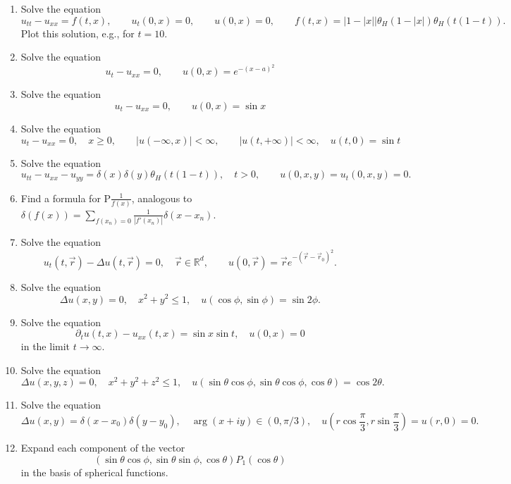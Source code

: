 \documentclass[a4paper,11pt]{article}
\begin{document}
\begin{enumerate}
\item\label{item:10} Solve the equation
\[u_{tt}-u_{xx} = f(t,x), \qquad u_t(0,x)=0, \qquad u(0,x)=0, \qquad f(t,x) = |1-|x||\theta_H(1-|x|)\theta_H(t(1-t)).\]
Plot this solution, e.g., for \(t=10\).

\item\label{item:11} Solve the equation
\[u_t-u_{xx}=0, \qquad u(0,x)=e^{-(x-a)^2}\]

\item\label{item:12} Solve the equation
\[u_t-u_{xx}=0, \qquad u(0,x)=\sin x\]

\item\label{item:13} Solve the equation
\[u_t-u_{xx}=0,\quad x\ge 0,\qquad |u(-\infty,x)|<\infty , \qquad |u(t,+\infty)|<\infty,\quad u(t,0)=\sin t\]

\item\label{item:14} Solve the equation
\[u_{tt}-u_{xx}-u_{yy}=\delta(x)\delta(y)\theta_H(t(1-t)), \quad t>0, \qquad u(0,x,y)=u_t(0,x,y)=0.\quad\]

\item\label{item:15} Find a formula for \(\mathrm{P}\frac1{f(x)}\), analogous to \(\delta(f(x))=\sum\limits_{f(x_n)=0}\frac1{|f'(x_n)|}\delta(x-x_n)\).

\item\label{item:16} Solve the equation
\[u_t(t,\vec{r})-\Delta u(t,\vec{r})=0, \quad \vec{r}\in \mathbb{R}^d,\qquad u(0,\vec{r})=\vec{r}e^{-(\vec{r}-\vec{r}_0)^2}.\]

\item\label{item:18} Solve the equation
\[\Delta u(x,y)=0, \quad x^2+y^2\le 1, \quad u(\cos\phi,\sin\phi) = \sin 2\phi.\]

\item\label{item:19} Solve the equation
\[\partial_tu(t,x)-u_{xx}(t,x)=\sin x\sin t, \quad u(0,x)=0\]
in the limit \(t\to \infty\).

\item\label{item:20} Solve the equation
\[
\Delta u(x,y,z)=0,\quad x^2+y^2+z^2\le 1, \quad u(\sin\theta\cos\phi,\sin\theta\cos\phi,\cos\theta)=\cos 2\theta.
\]

\item\label{item:21} Solve the equation
\[
\Delta u(x,y)=\delta(x-x_0)\delta(y-y_0), \quad \arg(x+iy)\in (0,\pi/3), \quad u(r\cos \frac{\pi}{3}, r\sin \frac{\pi}{3})=u(r,0)=0.
\]

\item\label{item:22} Expand each component of the vector
\[
(\sin\theta\cos\phi,\sin\theta\sin\phi,\cos\theta)P_1(\cos\theta)
\]
in the basis of spherical functions.


\end{enumerate}
\end{document}
